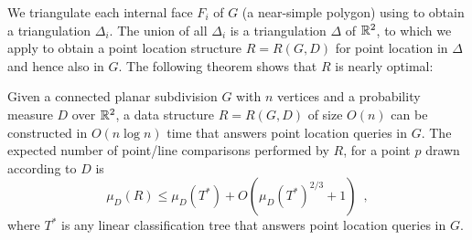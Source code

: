\documentclass[lotsofwhite]{patmorin}
\begin{document}
We triangulate each internal face $F_i$ of $G$ (a near-simple polygon)
using  to obtain a triangulation
$\Delta_i$. The union of all $\Delta_i$
is a triangulation $\Delta$ of $\mathbb{R}^2$, to which we apply
 to obtain a point location structure $R=R(G,D)$ for
point location in $\Delta$ and hence also in $G$.  The following
theorem shows that $R$ is nearly optimal:

\begin{thm}
Given a connected planar subdivision $G$ with $n$ vertices and a probability
measure $D$ over $\mathbb{R}^2$, a data structure $R=R(G,D)$ of size $O(n)$ can be
constructed in $O(n\log n)$ time that answers point location queries in $G$.
The expected number of point/line comparisons performed by $R$, 
for a point $p$ drawn according to $D$ is 
\[
  \mu_D(R) \le \mu_D(T^*) + O(\mu_D(T^*)^{2/3}+1) \enspace , 
\] 
where $T^*$ is any linear classification tree that answers point
location queries in $G$.
\end{thm}
\end{document}
